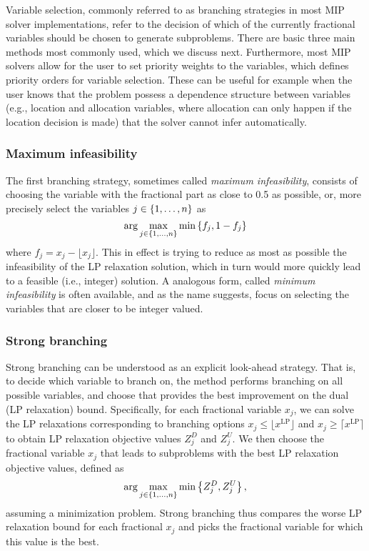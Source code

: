 Variable selection, commonly referred to as branching strategies in most MIP solver implementations, refer to the decision of which of the currently fractional variables should be chosen to generate subproblems. There are basic three main methods most commonly used, which we discuss next. Furthermore, most MIP solvers allow for the user to set priority weights to the variables, which defines priority orders for variable selection. These can be useful for example when the user knows that the problem possess a dependence structure between variables (e.g., location and allocation variables, where allocation can only happen if the location decision is made) that the solver cannot infer automatically. 


\subsubsection{Maximum infeasibility}

The first branching strategy, sometimes called \emph{maximum infeasibility}, consists of choosing the variable with the fractional part as close to 0.5 as possible, or, more precisely select the variables $j \in \left\{ 1, \dots, n \right \}$ as
%
\begin{equation*}
	\arg\max_{j \in \left\{ 1,\dots,n \right \}} \min\left\{ f_j, 1 - f_j \right \} 	
\end{equation*}
%
where $f_j = x_j - \lfloor x_j \rfloor$. This in effect is trying to reduce as most as possible the infeasibility of the LP relaxation solution, which in turn would more quickly lead to a feasible (i.e., integer) solution. A analogous form, called \emph{minimum infeasibility} is often available, and as the name suggests, focus on selecting the variables that are closer to be integer valued.

\subsubsection{Strong branching}

Strong branching can be understood as an explicit look-ahead strategy. That is, to decide which variable to branch on, the method performs branching on all possible variables, and choose that provides the best improvement on the dual (LP relaxation) bound. Specifically, for each fractional variable $x_j$, we can solve the LP relaxations corresponding to branching options $x_j \leq \lfloor x^\text{LP} \rfloor$ and $x_j \geq \lceil x^\text{LP} \rceil$ to obtain LP relaxation objective values $Z_j^D$ and $Z_j^U$. We then choose the fractional variable $x_j$ that leads to subproblems with the best LP relaxation objective values, defined as 
%
\begin{equation*}
	\arg\max_{j \in \left\{ 1,\dots,n \right \}} \min\left\{ Z_j^D, Z_j^U \right \}, 	
\end{equation*}
% 
assuming a minimization problem. Strong branching thus compares the worse LP relaxation bound for each fractional $x_j$ and picks the fractional variable for which this value is the best. 

